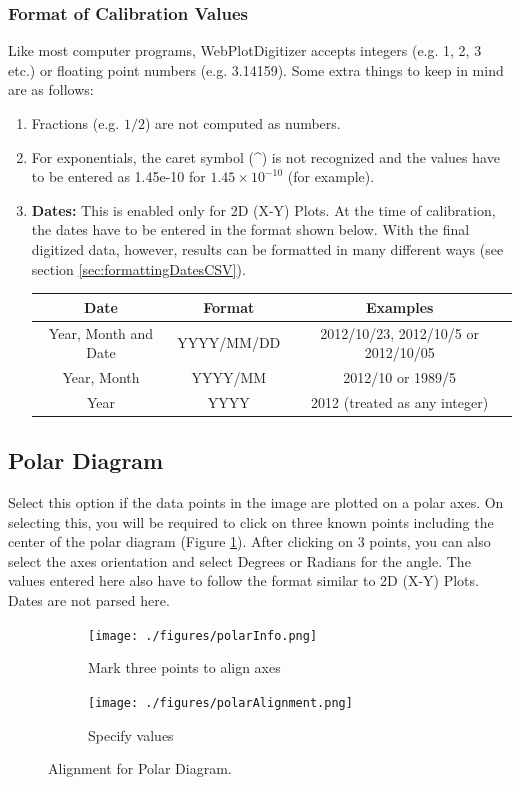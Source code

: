 \documentclass[letterpaper, 10pt]{article}
\begin{document}
\subsubsection{Format of Calibration Values}
\label{sec:formattingInput}
Like most computer programs, WebPlotDigitizer accepts integers (e.g. 1, 2, 3 etc.) or floating point numbers (e.g. 3.14159). Some extra things to keep in mind are as follows:
\begin{enumerate}
\item{Fractions (e.g. $1/2$) are not computed as numbers.}
\item{For exponentials, the caret symbol (\^{}) is not recognized and the values have to be entered as 1.45e-10 for $1.45 \times 10^{-10}$ (for example).}
\item{{\bf Dates:} This is enabled only for 2D (X-Y) Plots. At the time of calibration, the dates have to be entered in the format shown below. With the final digitized data, however, results can be formatted in many different ways (see section \ref{sec:formattingDatesCSV}).
\begin{center}
\begin{tabular}{|c|c|c|}
\hline
Date & Format & Examples\\
\hline
Year, Month and Date & YYYY/MM/DD & 2012/10/23, 2012/10/5 or 2012/10/05\\
Year, Month & YYYY/MM & 2012/10 or 1989/5\\
Year & YYYY & 2012 (treated as any integer)\\
\hline
\end{tabular}
\end{center}
}
\end{enumerate}





\subsection{Polar Diagram}
Select this option if the data points in the image are plotted on a polar axes. On selecting this, you will be required to click on three known points including the center of the polar diagram (Figure \ref{fig:polarAlignment}). After clicking on 3 points, you can also select the axes orientation and select Degrees or Radians for the angle. The values entered here also have to follow the format similar to 2D (X-Y) Plots. Dates are not parsed here.

\begin{figure}
\centering
{\begin{subfigure}[b]{0.4\textwidth}
\texttt{[image: ./figures/polarInfo.png]}
\caption{Mark three points to align axes}
\end{subfigure}
\begin{subfigure}[b]{0.3\textwidth}
\texttt{[image: ./figures/polarAlignment.png]}
\caption{Specify values}
\end{subfigure}}
\caption{Alignment for Polar Diagram.}
\label{fig:polarAlignment}
\end{figure}
 
\end{document}
